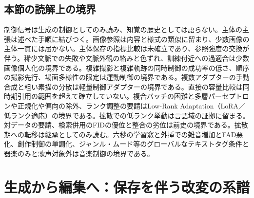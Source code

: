 \documentclass[lualatex,a4paper,10pt]{jlreq}
\begin{document}
\subsection{本節の読解上の境界}
制御信号は生成の制御としてのみ読み、知覚の歴史としては語らない。主体の主張は述べた手順に結びつく。画像参照は内容と様式の類似に留まり、少数画像の主体一貫には届かない\autocite{btd038}。主体保存の指標比較は未確立であり、参照強度の交換が伴う。稀少文脈での失敗や文脈外観の絡みと色ずれ、訓練付近への過適合は少数画像個人化の境界である\autocite{btd039}。複雑撮影と複雑軌跡の同時制御の成功率の低さ、順序の撮影先行、場面多様性の限定は運動制御の境界である\autocite{btd042}。複数アダプターの手動合成と粗い素描の分散は軽量制御アダプターの境界である\autocite{btd037}。直接の容量比較は同時期引用の範囲を超えて確立していない。複合バッチの困難と多層パーセプトロンや正規化や偏向の除外、ランク調整の要請はLow-Rank Adaptation（LoRA／低ランク適応）の境界である\autocite{btd040}。拡散での低ランク挙動は言語域の証拠に留まる。対データの要請、検索併用のFIDの優位と整合の劣位は前史の境界である\autocite{btd041}。拡散期への転移は継承としてのみ読む。六秒の学習窓と外挿での雑音増加とFAD悪化、創作制御の単調化、ジャンル・ムード等のグローバルなテキストタグ条件と器楽のみと歌声対象外は音楽制御の境界である\autocite{btd043}。

\section{生成から編集へ：保存を伴う改変の系譜}\label{sec:editing}
\end{document}
